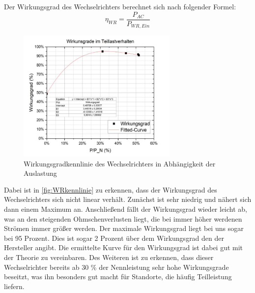 Der Wirkungsgrad des Wechselrichters berechnet sich nach folgender Formel:
%
\begin{equation}
	\eta_{ WR} = \frac{ P_{AC} }{ P_{WR,Ein} }
	\label{eq:230509_Wirkungsgrad}
\end{equation}
%
%
\begin{figure}[!ht]
		\centering
		\includegraphics[width=0.7\textwidth]{Abbildungen/Kennlinie wr}
		\caption{Wirkungsgradkennlinie des Wechselrichters in Abhängigkeit der Auslastung}
		\label{fig:WRkennlinie}
\end{figure}
%
Dabei ist in \autoref{fig:WRkennlinie} zu erkennen, dass der Wirkungsgrad des Wechselrichters sich nicht linear verhält. Zunächst ist sehr niedrig und nähert sich dann einem Maximum an. Anschließend fällt der Wirkungsgrad wieder leicht ab, was an den steigenden Ohmschenverlusten liegt, die bei immer höher werdenen Strömen immer größer werden. Der maximale Wirkungsgrad liegt bei uns sogar bei 95 Prozent. Dies ist sogar 2 Prozent über dem Wirkungsgrad den der Hersteller angibt. Die ermittelte Kurve für den Wirkungsgrad ist dabei gut mit der Theorie zu vereinbaren. Des Weiteren ist zu erkennen, dass dieser Wechselrichter bereits ab 30 \% der Nennleistung sehr hohe Wirkungsgrade beseitzt, was ihn besonders gut macht für Standorte, die häufig Teilleistung liefern.
